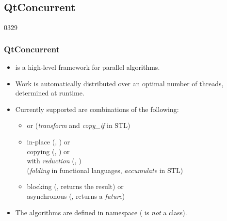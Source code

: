 %
%
%
%

\subsection{QtConcurrent}

\begin{slide}{0329}
\frametitle{QtConcurrent}\label{QtConcurrent}
  \begin{itemize}
  \item {} is a high-level framework for parallel algorithms.
  \item Work is automatically distributed over an optimal number of
    threads, determined at runtime.
  \item Currently supported are combinations of the following:
    \begin{itemize}
    \item {} or 
          (\textit{transform} and \textit{copy\_if} in STL)


    \item in-place (,
      ) or\\
      copying (, ) or\\
      with \emph{reduction} (, )\\
      (\emph{folding} in functional languages, \emph{accumulate} in STL)
    \item blocking (, returns the result) or\\
      asynchronous (, returns a \emph{future})
    \end{itemize}
  \item The algorithms are defined in namespace 
    ( is \emph{not} a class).
  \end{itemize}
\end{slide}

